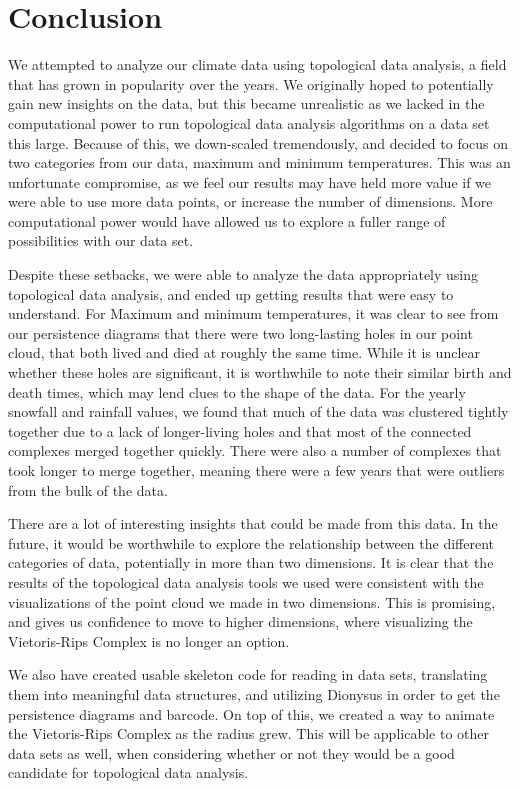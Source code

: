 \documentclass[12pt]{report}
\begin{document}
\section*{Conclusion}
We attempted to analyze our climate data using topological data analysis, a field that has grown in popularity over the years. We originally hoped to potentially gain new insights on the data, but this became unrealistic as we lacked in the computational power to run topological data analysis algorithms on a data set this large. Because of this, we down-scaled tremendously, and decided to focus on two categories from our data, maximum and minimum temperatures. This was an unfortunate compromise, as we feel our results may have held more value if we were able to use more data points, or increase the number of dimensions. More computational power would have allowed us to explore a fuller range of possibilities with our data set.\par
Despite these setbacks, we were able to analyze the data appropriately using topological data analysis, and ended up getting results that were easy to understand. For Maximum and minimum temperatures, it was clear to see from our persistence diagrams that there were two long-lasting holes in our point cloud, that both lived and died at roughly the same time. While it is unclear whether these holes are significant, it is worthwhile to note their similar birth and death times, which may lend clues to the shape of the data. For the yearly snowfall and rainfall values, we found that much of the data was clustered tightly together due to a lack of longer-living holes and that most of the connected complexes merged together quickly. There were also a number of complexes that took longer to merge together, meaning there were a few years that were outliers from the bulk of the data.\par
There are a lot of interesting insights that could be made from this data. In the future, it would be worthwhile to explore the relationship between the different categories of data, potentially in more than two dimensions. It is clear that the results of the topological data analysis tools we used were consistent with the visualizations of the point cloud we made in two dimensions. This is promising, and gives us confidence to move to higher dimensions, where visualizing the Vietoris-Rips Complex is no longer an option.\par
We also have created usable skeleton code for reading in data sets, translating them into meaningful data structures, and utilizing Dionysus in order to get the persistence diagrams and barcode. On top of this, we created a way to animate the Vietoris-Rips Complex as the radius grew. This will be applicable to other data sets as well, when considering whether or not they would be a good candidate for topological data analysis.\par
\end{document}
